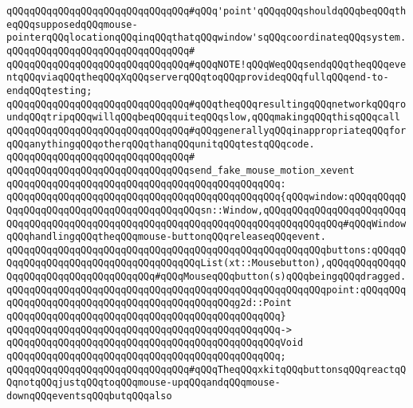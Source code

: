 \verb|qQQqqQQqqQQqqQQqqQQqqQQqqQQqqQQq#qQQq'point'qQQqqQQqshouldqQQqbeqQQqtheqQQqsupposedqQQqmouse-pointerqQQqlocationqQQqinqQQqthatqQQqwindow'sqQQqcoordinateqQQqsystem.|\newline
\verb|qQQqqQQqqQQqqQQqqQQqqQQqqQQqqQQq#|\newline
\verb|qQQqqQQqqQQqqQQqqQQqqQQqqQQqqQQq#qQQqNOTE!qQQqWeqQQqsendqQQqtheqQQqeventqQQqviaqQQqtheqQQqXqQQqserverqQQqtoqQQqprovideqQQqfullqQQqend-to-endqQQqtesting;|\newline
\verb|qQQqqQQqqQQqqQQqqQQqqQQqqQQqqQQq#qQQqtheqQQqresultingqQQqnetworkqQQqroundqQQqtripqQQqwillqQQqbeqQQqquiteqQQqslow,qQQqmakingqQQqthisqQQqcall|\newline
\verb|qQQqqQQqqQQqqQQqqQQqqQQqqQQqqQQq#qQQqgenerallyqQQqinappropriateqQQqforqQQqanythingqQQqotherqQQqthanqQQqunitqQQqtestqQQqcode.|\newline
\verb|qQQqqQQqqQQqqQQqqQQqqQQqqQQqqQQq#|\newline
\verb|qQQqqQQqqQQqqQQqqQQqqQQqqQQqqQQqsend_fake_mouse_motion_xevent|\newline
\verb|qQQqqQQqqQQqqQQqqQQqqQQqqQQqqQQqqQQqqQQqqQQqqQQq:|\newline
\verb|qQQqqQQqqQQqqQQqqQQqqQQqqQQqqQQqqQQqqQQqqQQqqQQq{qQQqwindow:qQQqqQQqqQQqqQQqqQQqqQQqqQQqqQQqqQQqqQQqqQQqsn::Window,qQQqqQQqqQQqqQQqqQQqqQQqqQQqqQQqqQQqqQQqqQQqqQQqqQQqqQQqqQQqqQQqqQQqqQQqqQQqqQQqqQQq#qQQqWindowqQQqhandlingqQQqtheqQQqmouse-buttonqQQqreleaseqQQqevent.|\newline
\verb|qQQqqQQqqQQqqQQqqQQqqQQqqQQqqQQqqQQqqQQqqQQqqQQqqQQqqQQqbuttons:qQQqqQQqqQQqqQQqqQQqqQQqqQQqqQQqqQQqqQQqList(xt::Mousebutton),qQQqqQQqqQQqqQQqqQQqqQQqqQQqqQQqqQQqqQQq#qQQqMouseqQQqbutton(s)qQQqbeingqQQqdragged.|\newline
\verb|qQQqqQQqqQQqqQQqqQQqqQQqqQQqqQQqqQQqqQQqqQQqqQQqqQQqqQQqpoint:qQQqqQQqqQQqqQQqqQQqqQQqqQQqqQQqqQQqqQQqqQQqqQQqg2d::Point|\newline
\verb|qQQqqQQqqQQqqQQqqQQqqQQqqQQqqQQqqQQqqQQqqQQqqQQq}|\newline
\verb|qQQqqQQqqQQqqQQqqQQqqQQqqQQqqQQqqQQqqQQqqQQqqQQq->|\newline
\verb|qQQqqQQqqQQqqQQqqQQqqQQqqQQqqQQqqQQqqQQqqQQqqQQqVoid|\newline
\verb|qQQqqQQqqQQqqQQqqQQqqQQqqQQqqQQqqQQqqQQqqQQqqQQq;|\newline
\newline
\verb|qQQqqQQqqQQqqQQqqQQqqQQqqQQqqQQq#qQQqTheqQQqxkitqQQqbuttonsqQQqreactqQQqnotqQQqjustqQQqtoqQQqmouse-upqQQqandqQQqmouse-downqQQqeventsqQQqbutqQQqalso|\newline
